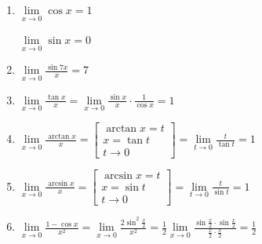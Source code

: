 \begin{example}{}{}
    \begin{enumerate}
        \item
            \( \displaystyle \lim\limits_{x \to 0} \cos x = 1 \)

            \( \displaystyle \lim\limits_{x \to 0} \sin x = 0 \)
        \item
            \( \displaystyle \lim\limits_{x \to 0} \frac{\sin 7x}{x} = 7 \)
        \item
            \( 
                \displaystyle
                \lim\limits_{x \to 0} \frac{\tan x}{x} 
                = \lim\limits_{x \to 0} \frac{\sin x}{x} \cdot \frac{1}{\cos x} = 1
            \)
        \item
            \(
                \displaystyle
                \lim\limits_{x \to 0} \frac{\arctan x}{x} =
                \left[
                    \begin{gathered}
                        \arctan x = t
                        \\
                        x = \tan t
                        \\
                        t \to 0
                    \end{gathered}
                \right] =
                \lim\limits_{t \to 0} \frac{t}{\tan t} = 1
            \)
        \item
            \(
                \displaystyle
                \lim\limits_{x \to 0} \frac{\arcsin x}{x} =
                \left[
                    \begin{gathered}
                        \arcsin x = t
                        \\
                        x = \sin t
                        \\
                        t \to 0
                    \end{gathered}
                \right] =
                \lim\limits_{t \to 0} \frac{t}{\sin t} = 1
            \)
        \item
            \(
                \displaystyle
                \lim\limits_{x \to 0} \frac{1 - \cos x}{x^2} =
                \lim\limits_{x \to 0} \frac{2 \sin^2 \frac{x}{2}}{x^2} =
                \frac{1}{2} \lim\limits_{x \to 0} 
                    \frac{\sin \frac{x}{2} \cdot \sin \frac{x}{2}}{\frac{x}{2} \cdot \frac{x}{2}} =
                \frac{1}{2}
            \)
    \end{enumerate}
\end{example}

